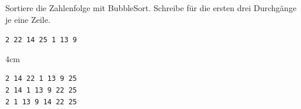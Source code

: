 \question[2]
Sortiere die Zahlenfolge mit BubbleSort.
Schreibe für die ersten drei Durchgänge je eine Zeile.

\texttt{2 22 14 25 1 13 9}

\begin{solutionbox}{4cm}
\begin{lstlisting}
2 14 22 1 13 9 25
2 14 1 13 9 22 25
2 1 13 9 14 22 25
\end{lstlisting}
\end{solutionbox}
